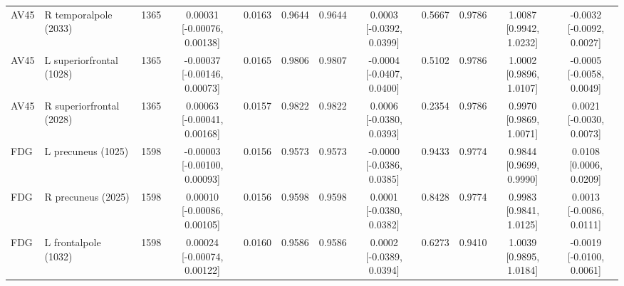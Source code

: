 \begin{landscape}
\begin{table}[p]
{\begin{tabular}{llrccccccccc}
AV45 & R temporalpole (2033) & 1365 & \shortstack{0.00031\\{}[-0.00076, 0.00138]} & 0.0163 & 0.9644 & 0.9644 & \shortstack{0.0003\\{}[-0.0392, 0.0399]} & 0.5667 & 0.9786 & \shortstack{1.0087\\{}[0.9942, 1.0232]} & \shortstack{-0.0032\\{}[-0.0092, 0.0027]} \\
AV45 & L superiorfrontal (1028) & 1365 & \shortstack{-0.00037\\{}[-0.00146, 0.00073]} & 0.0165 & 0.9806 & 0.9807 & \shortstack{-0.0004\\{}[-0.0407, 0.0400]} & 0.5102 & 0.9786 & \shortstack{1.0002\\{}[0.9896, 1.0107]} & \shortstack{-0.0005\\{}[-0.0058, 0.0049]} \\
AV45 & R superiorfrontal (2028) & 1365 & \shortstack{0.00063\\{}[-0.00041, 0.00168]} & 0.0157 & 0.9822 & 0.9822 & \shortstack{0.0006\\{}[-0.0380, 0.0393]} & 0.2354 & 0.9786 & \shortstack{0.9970\\{}[0.9869, 1.0071]} & \shortstack{0.0021\\{}[-0.0030, 0.0073]} \\
FDG & L precuneus (1025) & 1598 & \shortstack{-0.00003\\{}[-0.00100, 0.00093]} & 0.0156 & 0.9573 & 0.9573 & \shortstack{-0.0000\\{}[-0.0386, 0.0385]} & 0.9433 & 0.9774 & \shortstack{0.9844\\{}[0.9699, 0.9990]} & \shortstack{0.0108\\{}[0.0006, 0.0209]} \\
FDG & R precuneus (2025) & 1598 & \shortstack{0.00010\\{}[-0.00086, 0.00105]} & 0.0156 & 0.9598 & 0.9598 & \shortstack{0.0001\\{}[-0.0380, 0.0382]} & 0.8428 & 0.9774 & \shortstack{0.9983\\{}[0.9841, 1.0125]} & \shortstack{0.0013\\{}[-0.0086, 0.0111]} \\
FDG & L frontalpole (1032) & 1598 & \shortstack{0.00024\\{}[-0.00074, 0.00122]} & 0.0160 & 0.9586 & 0.9586 & \shortstack{0.0002\\{}[-0.0389, 0.0394]} & 0.6273 & 0.9410 & \shortstack{1.0039\\{}[0.9895, 1.0184]} & \shortstack{-0.0019\\{}[-0.0100, 0.0061]} \\

\end{tabular}}
\end{table}
\end{landscape}
